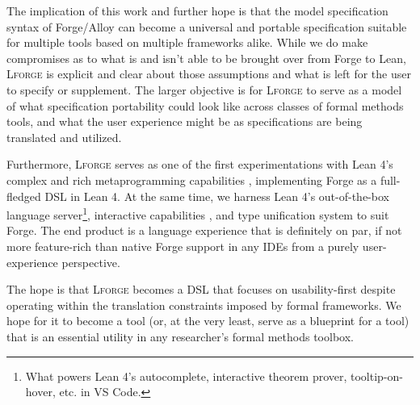 The implication of this work and further hope is that the model specification syntax of Forge/Alloy can become a universal and portable specification suitable for multiple tools based on multiple frameworks alike. While we do make compromises as to what is and isn't able to be brought over from Forge to Lean, \textsc{Lforge} is explicit and clear about those assumptions and what is left for the user to specify or supplement. The larger objective is for \textsc{Lforge} to serve as a model of what specification portability could look like across classes of formal methods tools, and what the user experience might be as specifications are being translated and utilized. 

Furthermore, \textsc{Lforge} serves as one of the first experimentations with Lean 4's complex and rich metaprogramming capabilities \cite{metaprogramming}, implementing Forge as a full-fledged DSL in Lean 4. At the same time, we harness Lean 4's out-of-the-box language server\footnote{What powers Lean 4's autocomplete, interactive theorem prover, tooltip-on-hover, etc. in VS Code.}, interactive capabilities \cite{nawrocki2023extensible}, and type unification system to suit Forge. The end product is a language experience that is definitely on par, if not more feature-rich than native Forge support in any IDEs from a purely user-experience perspective. 

The hope is that \textsc{Lforge} becomes a DSL that focuses on usability-first despite operating within the translation constraints imposed by formal frameworks. We hope for it to become a tool (or, at the very least, serve as a blueprint for a tool) that is an essential utility in any researcher's formal methods toolbox. 